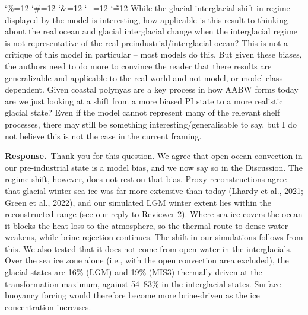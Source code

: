 \documentclass[11pt,a4paper]{article}
\newcommand{\comment}[1]{\par\medskip\noindent\color{black}\begingroup\catcode`\%=12 \catcode`\#=12 \catcode`\&=12 \catcode`\_=12 \catcode`\~=12 \commentbody}
\newcommand{\commentbody}[1]{#1\endgroup\par\smallskip}
\newcommand{\response}{\par\noindent\color{chgcol}\textbf{Response.}\ }
\begin{document}
\comment{R3}{While the glacial-interglacial shift in regime displayed by the model is interesting, how applicable is this result to thinking about the real ocean and glacial interglacial change when the interglacial regime is not representative of the real preindustrial/interglacial ocean? This is not a critique of this model in particular – most models do this. But given these biases, the authors need to do more to convince the reader that there results are generalizable and applicable to the real world and not model, or model-class dependent. Given coastal polynyas are a key process in how AABW forms today are we just looking at a shift from a more biased PI state to a more realistic glacial state? Even if the model cannot represent many of the relevant shelf processes, there may still be something interesting/generalisable to say, but I do not believe this is not the case in the current framing.}



\response Thank you for this question. We agree that open-ocean convection in our pre-industrial state is a model bias, and we now say so in the Discussion. The regime shift, however, does not rest on that bias. Proxy reconstructions agree that glacial winter sea ice was far more extensive than today (Lhardy et al., 2021; Green et al., 2022), and our simulated LGM winter extent lies within the reconstructed range (see our reply to Reviewer 2). Where sea ice covers the ocean it blocks the heat loss to the atmosphere, so the thermal route to dense water weakens, while brine rejection continues. The shift in our simulations follows from this. We also tested that it does not come from open water in the interglacials. Over the sea ice zone alone (i.e., with the open convection area excluded), the glacial states are 16\% (LGM) and 19\% (MIS3) thermally driven at the transformation maximum, against 54--83\% in the interglacial states. Surface buoyancy forcing would therefore become more brine-driven as the ice concentration increases. 
\end{document}

